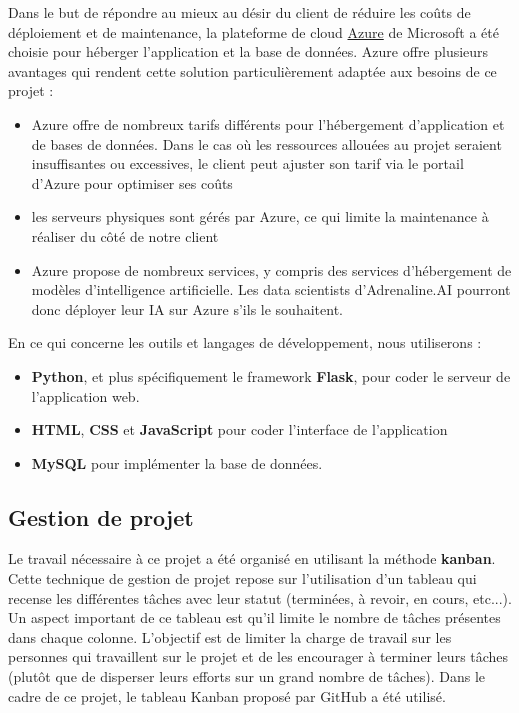 \documentclass[french]{article}
\begin{document}
    Dans le but de répondre au mieux au désir du client de réduire les coûts de déploiement et de maintenance, la plateforme de cloud \href{https://azure.microsoft.com/fr-fr/}{Azure} de Microsoft a été choisie pour héberger l'application et la base de données. Azure offre plusieurs avantages qui rendent cette solution particulièrement adaptée aux besoins de ce projet :
    \begin{itemize}
        \item Azure offre de nombreux tarifs différents pour l'hébergement d'application et de bases de données. Dans le cas où les ressources allouées au projet seraient insuffisantes ou excessives, le client peut ajuster son tarif via le portail d'Azure pour optimiser ses coûts
        \item les serveurs physiques sont gérés par Azure, ce qui limite la maintenance à réaliser du côté de notre client
        \item Azure propose de nombreux services, y compris des services d'hébergement de modèles d'intelligence artificielle. Les data scientists d'Adrenaline.AI pourront donc déployer leur IA sur Azure s'ils le souhaitent.
    \end{itemize}

    En ce qui concerne les outils et langages de développement, nous utiliserons :
    \begin{itemize}
        \item \textbf{Python}, et plus spécifiquement le framework \textbf{Flask}, pour coder le serveur de l'application web.
        \item \textbf{HTML}, \textbf{CSS} et \textbf{JavaScript} pour coder l'interface de l'application
        \item \textbf{MySQL} pour implémenter la base de données.
    \end{itemize}
    \subsection{Gestion de projet}

    Le travail nécessaire à ce projet a été organisé en utilisant la méthode \textbf{kanban}. Cette technique de gestion de projet repose sur l'utilisation d'un tableau qui recense les différentes tâches avec leur statut (terminées, à revoir, en cours, etc...). Un aspect important de ce tableau est qu'il limite le nombre de tâches présentes dans chaque colonne. L'objectif est de limiter la charge de travail sur les personnes qui travaillent sur le projet et de les encourager à terminer leurs tâches (plutôt que de disperser leurs efforts sur un grand nombre de tâches). Dans le cadre de ce projet, le tableau Kanban proposé par GitHub a été utilisé.
\end{document}
